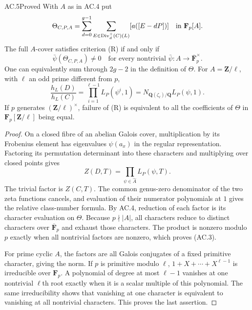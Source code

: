 \begin{claim}{AC.5}{Proved}
With $A$ as in AC.4 put
\[
 \Theta_{C,P,A}=\sum_{d=0}^{g-1}
   \sum_{E\in\operatorname{Div}^{+}_d(C)(L)}[a([E-dP])]
                      \quad\hbox{in }\mathbf F_p[A].
\]
The full $A$-cover satisfies criterion (R) if and only if
\[
     \bar\psi(\Theta_{C,P,A})\ne0
       \quad\text{for every nontrivial }
          \bar\psi:A\to\overline{\mathbf F}_p^{\times}.    \tag{AC.3}
\]
One can equivalently sum through $2g-2$ in the definition of $\Theta$.
For $A=\mathbf Z/\ell$, with $\ell$ an odd prime different from $p$,
\[
 \frac{h_L(D)}{h_L(C)}
       =\prod_{i=1}^{\ell-1}L_P(\psi^i,1)
       =N_{\mathbf Q(\zeta_\ell)/\mathbf Q}L_P(\psi,1).
\]
If $p$ generates $(\mathbf Z/\ell)^\times$, failure of (R) is equivalent
to all the coefficients of $\Theta$ in $\mathbf F_p[\mathbf Z/\ell]$
being equal.
\end{claim}
\begin{proof}
On a closed fibre of an abelian Galois cover, multiplication by its
Frobenius element has eigenvalues $\psi(a_x)$ in the regular
representation.  Factoring its permutation determinant into these
characters and multiplying over closed points gives
\[
                 Z(D,T)=\prod_{\psi\in\widehat A}L_P(\psi,T).
\]
The trivial factor is $Z(C,T)$.  The common genus-zero denominator of the
two zeta functions cancels, and evaluation of their numerator polynomials
at $1$ gives the relative class-number formula.  By AC.4, reduction of each
factor is its character evaluation on $\Theta$.  Because $p\nmid|A|$,
all characters reduce to distinct characters over
$\overline{\mathbf F}_p$ and exhaust those characters.  The product is
nonzero modulo $p$ exactly when all nontrivial factors are nonzero, which
proves (AC.3).

For prime cyclic $A$, the factors are all Galois conjugates of a fixed
primitive character, giving the norm.  If $p$ is primitive modulo $\ell$,
$1+X+\cdots+X^{\ell-1}$ is irreducible over $\mathbf F_p$.
A polynomial of degree at most $\ell-1$ vanishes at one nontrivial
$\ell$th root exactly when it is a scalar multiple of this polynomial.
The same irreducibility shows that vanishing at one character is equivalent
to vanishing at all nontrivial characters.  This proves the last assertion.
\end{proof}

